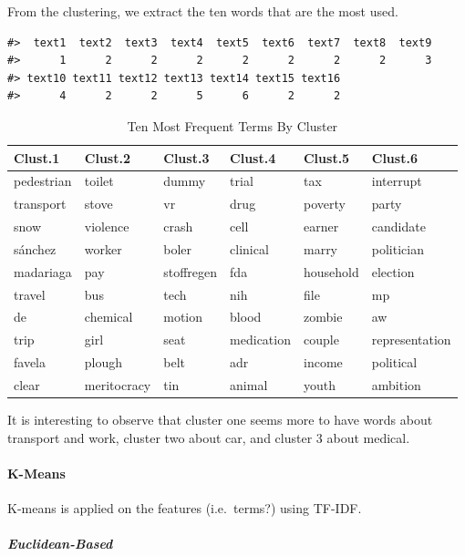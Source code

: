 \documentclass[
]{article}
\begin{document}
From the clustering, we extract the ten words that are the most used.

\begin{verbatim}
#>  text1  text2  text3  text4  text5  text6  text7  text8  text9 
#>      1      2      2      2      2      2      2      2      3 
#> text10 text11 text12 text13 text14 text15 text16 
#>      4      2      2      5      6      2      2
\end{verbatim}

\begin{table}

\caption{\label{tab:Euclidean-based cutree}Ten Most Frequent Terms By Cluster}
\centering
\begin{tabular}[t]{l|l|l|l|l|l}
\hline
Clust.1 & Clust.2 & Clust.3 & Clust.4 & Clust.5 & Clust.6\\
\hline
pedestrian & toilet & dummy & trial & tax & interrupt\\
\hline
transport & stove & vr & drug & poverty & party\\
\hline
snow & violence & crash & cell & earner & candidate\\
\hline
sánchez & worker & boler & clinical & marry & politician\\
\hline
madariaga & pay & stoffregen & fda & household & election\\
\hline
travel & bus & tech & nih & file & mp\\
\hline
de & chemical & motion & blood & zombie & aw\\
\hline
trip & girl & seat & medication & couple & representation\\
\hline
favela & plough & belt & adr & income & political\\
\hline
clear & meritocracy & tin & animal & youth & ambition\\
\hline
\end{tabular}
\end{table}

It is interesting to observe that cluster one seems more to have words
about transport and work, cluster two about car, and cluster 3 about
medical.

\hypertarget{k-means}{%
\paragraph{K-Means}\label{k-means}}

K-means is applied on the features (i.e.~terms?) using TF-IDF.

\hypertarget{euclidean-based}{%
\subparagraph{Euclidean-Based}\label{euclidean-based}}
\end{document}
